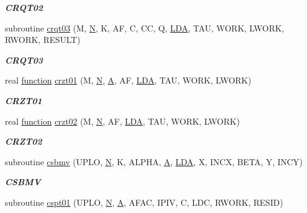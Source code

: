 \begin{DoxyCompactItemize}
\begin{DoxyCompactList}\small\item\em {\bfseries C\+R\+Q\+T02} \end{DoxyCompactList}\item 
subroutine \hyperlink{group__complex__lin_ga5e3d90595708a5e4309b8a0a21c9cb46}{crqt03} (M, \hyperlink{polmisc_8c_a0240ac851181b84ac374872dc5434ee4}{N}, K, A\+F, C, C\+C, Q, \hyperlink{example__user_8c_ae946da542ce0db94dced19b2ecefd1aa}{L\+D\+A}, T\+A\+U, W\+O\+R\+K, L\+W\+O\+R\+K, R\+W\+O\+R\+K, R\+E\+S\+U\+L\+T)
\begin{DoxyCompactList}\small\item\em {\bfseries C\+R\+Q\+T03} \end{DoxyCompactList}\item 
real \hyperlink{afunc_8m_a7b5e596df91eadea6c537c0825e894a7}{function} \hyperlink{group__complex__lin_ga1b7848707edf34d5cb70cbc235f9165f}{crzt01} (M, \hyperlink{polmisc_8c_a0240ac851181b84ac374872dc5434ee4}{N}, \hyperlink{classA}{A}, A\+F, \hyperlink{example__user_8c_ae946da542ce0db94dced19b2ecefd1aa}{L\+D\+A}, T\+A\+U, W\+O\+R\+K, L\+W\+O\+R\+K)
\begin{DoxyCompactList}\small\item\em {\bfseries C\+R\+Z\+T01} \end{DoxyCompactList}\item 
real \hyperlink{afunc_8m_a7b5e596df91eadea6c537c0825e894a7}{function} \hyperlink{group__complex__lin_gaea0244eedc9f073dc522d4183de1a34e}{crzt02} (M, \hyperlink{polmisc_8c_a0240ac851181b84ac374872dc5434ee4}{N}, A\+F, \hyperlink{example__user_8c_ae946da542ce0db94dced19b2ecefd1aa}{L\+D\+A}, T\+A\+U, W\+O\+R\+K, L\+W\+O\+R\+K)
\begin{DoxyCompactList}\small\item\em {\bfseries C\+R\+Z\+T02} \end{DoxyCompactList}\item 
subroutine \hyperlink{group__complex__lin_ga93ee535a3f54f2c0ea6d2da4f7d8fa84}{csbmv} (U\+P\+L\+O, \hyperlink{polmisc_8c_a0240ac851181b84ac374872dc5434ee4}{N}, K, A\+L\+P\+H\+A, \hyperlink{classA}{A}, \hyperlink{example__user_8c_ae946da542ce0db94dced19b2ecefd1aa}{L\+D\+A}, X, I\+N\+C\+X, B\+E\+T\+A, Y, I\+N\+C\+Y)
\begin{DoxyCompactList}\small\item\em {\bfseries C\+S\+B\+M\+V} \end{DoxyCompactList}\item 
subroutine \hyperlink{group__complex__lin_ga99144e08160bc01893ddea6649e90381}{cspt01} (U\+P\+L\+O, \hyperlink{polmisc_8c_a0240ac851181b84ac374872dc5434ee4}{N}, \hyperlink{classA}{A}, A\+F\+A\+C, I\+P\+I\+V, C, L\+D\+C, R\+W\+O\+R\+K, R\+E\+S\+I\+D)

\end{DoxyCompactItemize}
